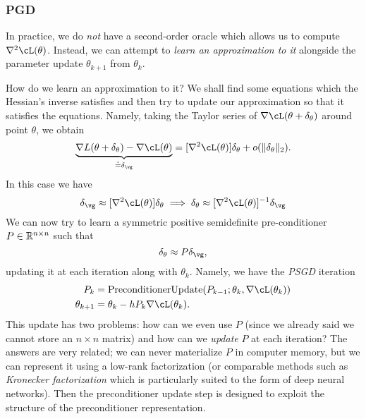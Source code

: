 \documentclass[../../book-main.tex]{subfiles}
\begin{document}
\subsubsection{PGD}

In practice, we do \textit{not} have a second-order oracle which allows us to compute \(\nabla^{2}\cL(\theta)\). Instead, we can attempt to \textit{learn an approximation to it} alongside the parameter update \(\theta_{k + 1}\) from \(\theta_{k}\). 

How do we learn an approximation to it? We shall find some equations which the Hessian's inverse satisfies and then try to update our approximation so that it satisfies the equations. Namely, taking the Taylor series of \(\nabla \cL(\theta + \delta_{\theta})\) around point \(\theta\), we obtain 
\begin{equation}
    \underbrace{\nabla L(\theta + \delta_{\theta}) - \nabla \cL(\theta)}_{\doteq \delta_{\vg}} = [\nabla^{2} \cL(\theta)]\delta_{\theta} + o(\norm{\delta_{\theta}}_{2}).
\end{equation}
In this case we have 
\begin{equation}
    \delta_{\vg} \approx [\nabla^{2}\cL(\theta)]\delta_{\theta} \implies \delta_{\theta} \approx [\nabla^{2}\cL(\theta)]^{-1}\delta_{\vg}
\end{equation}
We can now try to learn a symmetric positive semidefinite pre-conditioner \(P \in \mathbb{R}^{n \times n}\) such that 
\begin{equation}
    \delta_{\theta} \approx P\delta_{\vg},
\end{equation}
updating it at each iteration along with \(\theta_{k}\). Namely, we have the \textit{PSGD} iteration
\begin{align}
    P_{k}
    &= \mathrm{PreconditionerUpdate}(P_{k - 1}; \theta_{k}, \nabla \cL(\theta_{k})) \\ 
    \theta_{k + 1}
    &= \theta_{k} - hP_{k}\nabla \cL(\theta_{k}).
\end{align}
This update has two problems: how can we even use \(P\) (since we already said we cannot store an \(n \times n\) matrix) and how can we \textit{update} \(P\) at each iteration? The answers are very related; we can never materialize \(P\) in computer memory, but we can represent it using a low-rank factorization (or comparable methods such as \textit{Kronecker factorization} which is particularly suited to the form of deep neural networks). Then the preconditioner update step is designed to exploit the structure of the preconditioner representation.
\end{document}
